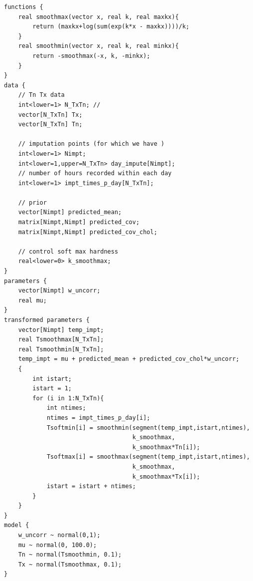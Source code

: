 \documentclass[letter]{article}
\begin{document}
\label{sec:appendix_stan}
        \begin{verbatim}
functions {
    real smoothmax(vector x, real k, real maxkx){
        return (maxkx+log(sum(exp(k*x - maxkx))))/k;
    }
    real smoothmin(vector x, real k, real minkx){
        return -smoothmax(-x, k, -minkx);
    }
}
data {
    // Tn Tx data
    int<lower=1> N_TxTn; //
    vector[N_TxTn] Tx;
    vector[N_TxTn] Tn;

    // imputation points (for which we have )
    int<lower=1> Nimpt;
    int<lower=1,upper=N_TxTn> day_impute[Nimpt];
    // number of hours recorded within each day
    int<lower=1> impt_times_p_day[N_TxTn];

    // prior 
    vector[Nimpt] predicted_mean;
    matrix[Nimpt,Nimpt] predicted_cov;
    matrix[Nimpt,Nimpt] predicted_cov_chol;

    // control soft max hardness
    real<lower=0> k_smoothmax;
}
parameters {
    vector[Nimpt] w_uncorr;
    real mu;
}
transformed parameters {
    vector[Nimpt] temp_impt;
    real Tsmoothmax[N_TxTn];
    real Tsmoothmin[N_TxTn];  
    temp_impt = mu + predicted_mean + predicted_cov_chol*w_uncorr;
    {
        int istart;
        istart = 1;
        for (i in 1:N_TxTn){
            int ntimes;
            ntimes = impt_times_p_day[i];
            Tsoftmin[i] = smoothmin(segment(temp_impt,istart,ntimes), 
                                    k_smoothmax, 
                                    k_smoothmax*Tn[i]);
            Tsoftmax[i] = smoothmax(segment(temp_impt,istart,ntimes), 
                                    k_smoothmax,
                                    k_smoothmax*Tx[i]);
            istart = istart + ntimes;
        }
    }
}
model {
    w_uncorr ~ normal(0,1);
    mu ~ normal(0, 100.0);
    Tn ~ normal(Tsmoothmin, 0.1);
    Tx ~ normal(Tsmoothmax, 0.1);
}
\end{verbatim}
    



    
    



    
    
\end{document}
